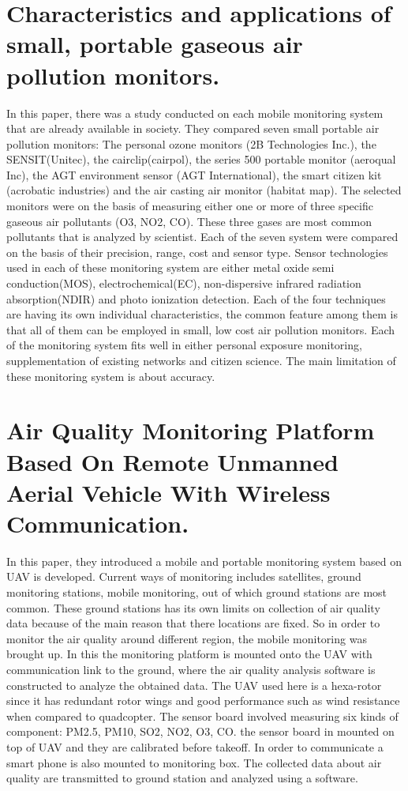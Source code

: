 \documentclass[11pt]{article}
\begin{document}
\section{Characteristics and applications of small, portable gaseous air pollution monitors.} \cite{McKercher2017}
In this paper, there was a study conducted on each mobile monitoring system that are already available in society. They compared seven small portable air pollution monitors: The personal ozone monitors (2B Technologies Inc.), the SENSIT(Unitec), the cairclip(cairpol), the series 500 portable monitor (aeroqual Inc), the AGT environment sensor (AGT International), the smart citizen kit (acrobatic industries) and the air casting air monitor (habitat map). The selected monitors were on the basis of measuring either one or more of three specific gaseous air pollutants (O3, NO2, CO). These three gases are most common pollutants that is analyzed by scientist. Each of the seven system were compared on the basis of their precision, range, cost and sensor type. Sensor technologies used in each of these monitoring system are either metal oxide semi conduction(MOS), electrochemical(EC), non-dispersive infrared radiation absorption(NDIR) and photo ionization detection. Each of the four techniques are having its own individual characteristics, the common feature among them is that all of them can be employed in small, low cost air pollution monitors. Each of the monitoring system fits well in either personal exposure monitoring, supplementation of existing networks and citizen science. The main limitation of these monitoring system is about accuracy.

\section{Air Quality Monitoring Platform Based On Remote Unmanned Aerial Vehicle With Wireless Communication.}\cite{Zhi2017}

In this paper, they introduced a mobile and portable monitoring system based on UAV is developed. Current ways of monitoring includes satellites, ground monitoring stations, mobile monitoring, out of which ground stations are most common. These ground stations has its own limits on collection of air quality data because of the main reason that there locations are fixed. So in order to monitor the air quality around different region, the mobile monitoring was brought up. In this the monitoring platform is mounted onto the UAV with communication link to the ground, where the air quality analysis software is constructed to analyze the obtained data. The UAV used here is a hexa-rotor since it has redundant rotor wings and good performance such as wind resistance when compared to quadcopter.
The sensor board involved measuring six kinds of component: PM2.5, PM10, SO2, NO2, O3, CO. the sensor board in mounted on top of UAV and they are calibrated before takeoff. In order to communicate a smart phone is also mounted to monitoring box. The collected data about air quality are transmitted to ground station and analyzed using a software.  
\end{document}
